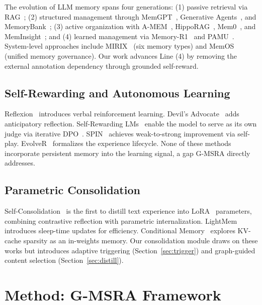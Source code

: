 \documentclass{article}
\newcommand{\gmsra}{\textsc{G-MSRA}}
\begin{document}
The evolution of LLM memory spans four generations: (1) passive retrieval via RAG~\citep{lewis2020rag}; (2) structured management through MemGPT~\citep{packer2023memgpt}, Generative Agents~\citep{park2023generative}, and MemoryBank~\citep{zhong2024memorybank}; (3) active organization with A-MEM~\citep{xu2025amem}, HippoRAG~\citep{gutierrez2024hipporag}, Mem0~\citep{chhikara2025mem0}, and MemInsight~\citep{meminsight2025}; and (4) learned management via Memory-R1~\citep{chen2025memoryr1} and PAMU~\citep{wang2025pamu}. System-level approaches include MIRIX~\citep{mirix2025} (six memory types) and MemOS~\citep{memos2025} (unified memory governance). Our work advances Line (4) by removing the external annotation dependency through grounded self-reward.

\subsection{Self-Rewarding and Autonomous Learning}

Reflexion~\citep{shinn2023reflexion} introduces verbal reinforcement learning. Devil's Advocate~\citep{xi2024devilsadvocate} adds anticipatory reflection. Self-Rewarding LMs~\citep{yuan2024selfrewarding} enable the model to serve as its own judge via iterative DPO~\citep{rafailov2023dpo}. SPIN~\citep{chen2024spin} achieves weak-to-strong improvement via self-play. EvolveR~\citep{evolver2025} formalizes the experience lifecycle. None of these methods incorporate persistent memory into the learning signal, a gap \gmsra{} directly addresses.

\subsection{Parametric Consolidation}

Self-Consolidation~\citep{zhang2026selfconsolidation} is the first to distill text experience into LoRA~\citep{hu2022lora} parameters, combining contrastive reflection with parametric internalization. LightMem~\citep{lightmem2025} introduces sleep-time updates for efficiency. Conditional Memory~\citep{condmem2026} explores KV-cache sparsity as an in-weights memory. Our consolidation module draws on these works but introduces adaptive triggering (Section~\ref{sec:trigger}) and graph-guided content selection (Section~\ref{sec:distill}).


\section{Method: \gmsra{} Framework}
\label{sec:method}
\end{document}
